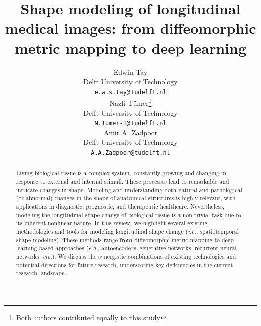 \documentclass[nonatbib]{article}
\title{Shape modeling of longitudinal medical images: from diffeomorphic metric mapping to deep learning}
\author{
  Edwin Tay \\
  Delft University of Technology\\
  \texttt{e.w.s.tay@tudelft.nl} \\
  \AND
  Nazli Tümer\thanks{Both authors contributed equally to this study} \\
  Delft University of Technology\\
  \texttt{N.Tumer-1@tudelft.nl} \\
  \And
  Amir A. Zadpoor\footnotemark[1] \\
  Delft University of Technology\\
  \texttt{A.A.Zadpoor@tudelft.nl} \\
}
\begin{document}
\maketitle

\begin{abstract}


    Living biological tissue is a complex system, constantly growing and changing in response to external and internal stimuli. These processes lead to remarkable and intricate changes in shape. Modeling and understanding both natural and pathological (or abnormal) changes in the shape of anatomical structures is highly relevant, with applications in diagnostic, prognostic, and therapeutic healthcare. Nevertheless, modeling the longitudinal shape change of biological tissue is a non-trivial task due to its inherent nonlinear nature. In this review, we highlight several existing methodologies and tools for modeling longitudinal shape change (\textit{i.e.,} spatiotemporal shape modeling). These methods range from diffeomorphic metric mapping to deep-learning based approaches (\textit{e.g.,} autoencoders, generative networks, recurrent neural networks, \textit{etc.}). We discuss the synergistic combinations of existing technologies and potential directions for future research, underscoring key deficiencies in the current research landscape.
 
\end{abstract}










\end{document}
